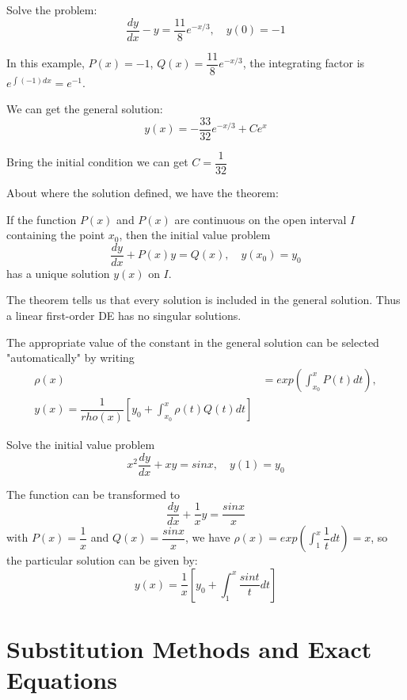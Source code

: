 \begin{example}
    Solve the problem:
    \[
        \dfrac{dy}{dx} - y = \dfrac{11}{8} e^{-x/3}, \quad y(0) = -1
    \]

    In this example, \(P(x) = -1\), \(Q(x) = \dfrac{11}{8}e^{-x/3}\), the integrating factor is \(e^{\int (-1) dx} = e^{-1}\). 

    We can get the general solution:
    \[
        y(x) = -\dfrac{33}{32}e^{-x/3} + Ce^x
    \]

    Bring the initial condition we can get \(C = \dfrac{1}{32}\) 
\end{example}

About where the solution defined, we have the theorem:
\begin{theorem}
    If the function \(P(x)\) and \(P(x)\) are continuous on the open interval \(I\) containing the point \(x_0\), then the initial value problem
    \[
        \dfrac{dy}{dx} + P(x)y = Q(x), \quad y(x_0) = y_0
    \]   
    has a unique solution \(y(x)\) on \(I\).
\end{theorem}
\begin{remark}
    The theorem tells us that every solution is included in the general solution. Thus a linear first-order DE has no singular solutions.
\end{remark}
\begin{remark}
    The appropriate value of the constant in the general solution can be selected "automatically" by writing
    \begin{align*}
        \rho(x) &= exp(\int_{x_0}^x P(t) dt),\\
        y(x) = \dfrac{1}{rho(x)} [y_0 + \int_{x_0}^x \rho(t) Q(t) dt]
    \end{align*}
\end{remark}


\begin{example}
    Solve the initial value problem
    \[
        x^2 \dfrac{dy}{dx} + xy= sin x, \quad y(1) = y_0
    \] 

    The function can be transformed to
    \[
        \dfrac{dy}{dx} + \dfrac{1}{x}y = \dfrac{sin x}{x}
    \]
    with \(P(x) = \dfrac{1}{x}\) and \(Q(x) = \dfrac{sin x}{x}\), we have \(\rho(x) = exp(\int_1^x \dfrac{1}{t}dt) = x\),
    so the particular solution can be given by:
    \[
        y(x) = \dfrac{1}{x} [y_0 + \int_1^x \dfrac{sin t}{t}dt]
    \]
\end{example}

\section{Substitution Methods and Exact Equations}